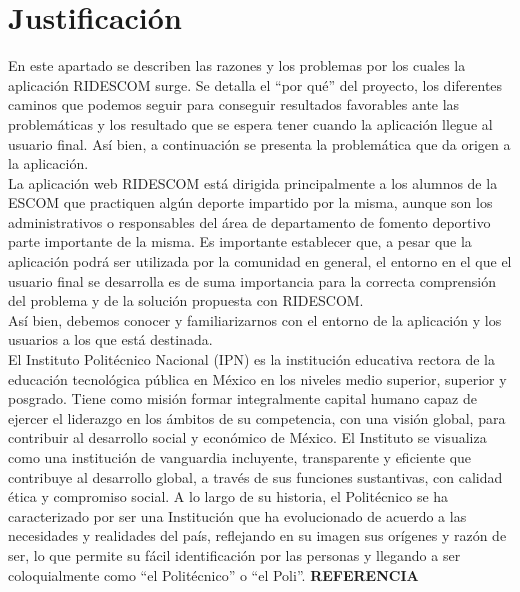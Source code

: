 	\section{Justificaci\'on}
	En este apartado se describen las razones y los  problemas por los cuales la aplicación RIDESCOM surge. Se detalla el “por qué” del proyecto, los diferentes caminos que podemos seguir para conseguir resultados favorables ante las problemáticas y los resultado que se espera tener cuando la aplicación llegue al usuario final. Así bien, a continuación se presenta la problemática que da origen a la aplicación.\\
	La aplicación web RIDESCOM está dirigida principalmente a los alumnos de la ESCOM que practiquen algún deporte impartido por la misma, aunque son los administrativos o responsables del área de departamento de fomento deportivo parte importante de la misma. Es importante establecer que, a pesar que la aplicación podrá ser utilizada por la comunidad en general,  el entorno en el que el usuario final se desarrolla es de suma importancia para la correcta comprensión del problema y de la solución propuesta con RIDESCOM.\\ 
	Así bien, debemos conocer y familiarizarnos con el entorno de la aplicación y los usuarios a los que está destinada. \\
	El Instituto Politécnico Nacional (IPN) es la institución educativa rectora de la educación tecnológica pública en México en los niveles medio superior, superior y posgrado. Tiene como misión formar integralmente capital humano capaz de ejercer el liderazgo en los ámbitos de su competencia, con una visión global, para contribuir al desarrollo social y económico de México. El Instituto se visualiza como una institución de vanguardia incluyente, transparente y eficiente que contribuye al desarrollo global, a través de sus funciones sustantivas, con calidad ética y compromiso social. A lo largo de su historia, el Politécnico se ha caracterizado por ser una Institución que ha evolucionado de acuerdo a las necesidades y realidades del país, reflejando en su imagen sus orígenes y razón de ser, lo que permite su fácil identificación por las personas y llegando a ser coloquialmente como “el Politécnico” o “el Poli”. \textbf{REFERENCIA} \\
